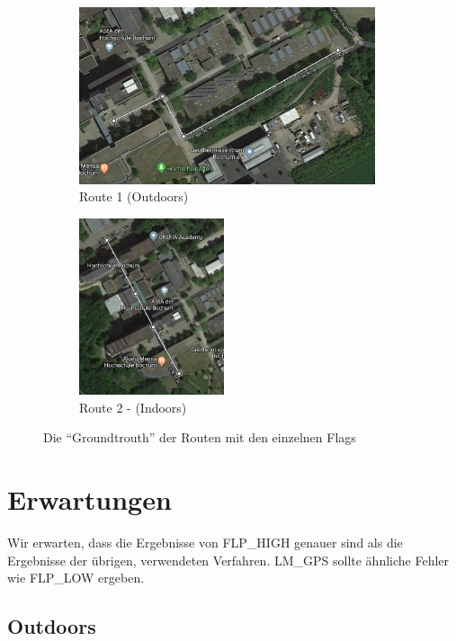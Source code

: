\begin{figure}[h!]
	\centering
	\begin{subfigure}[b]{.64\textwidth}
		\centering
        \includegraphics[height=5.2cm]{route1}
        \caption{Route  1 (Outdoors)}
        \label{fig:route1}
    \end{subfigure}
    \begin{subfigure}[b]{.35\textwidth}
    	\centering
        \includegraphics[height=5.2cm]{route2}
        \caption{Route 2 - (Indoors)}
        \label{fig:route2}
    \end{subfigure}
    \caption{Die "`Groundtrouth"' der Routen mit den einzelnen Flags}
    \label{fig:routen}
\end{figure}

\section{Erwartungen}

Wir erwarten, dass die Ergebnisse von FLP\_HIGH genauer sind als die Ergebnisse der übrigen, verwendeten Verfahren. LM\_GPS sollte ähnliche Fehler wie FLP\_LOW ergeben. 

\subsection{Outdoors}

%


